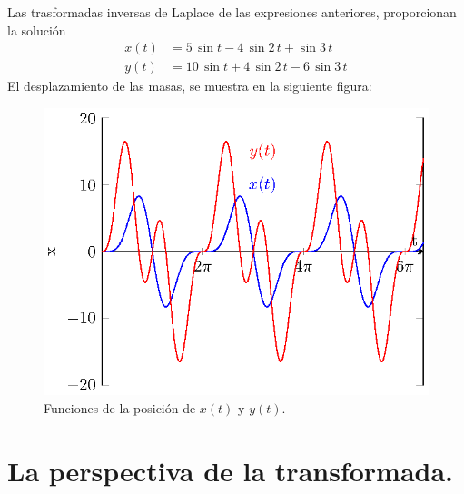 \par
Las trasformadas inversas de Laplace de las expresiones anteriores, proporcionan la solución
\begin{align*}
x(t) &= 5 \, \sin t - 4 \, \sin 2 \, t + \sin 3 \, t \\[0.5em]
y(t) &= 10 \, \sin t + 4 \, \sin 2 \, t - 6 \, \sin 3 \, t
\end{align*}
El desplazamiento de las masas, se muestra en la siguiente figura:
\begin{figure}[H]
    \centering
    \includegraphics[scale=1.3]{Imagenes/sist_dos_masas_plot.eps}
    \caption{Funciones de la posición de $x(t)$ y $y(t)$.}
    \label{fig:figura_006}    
\end{figure}

\section{La perspectiva de la transformada.}

